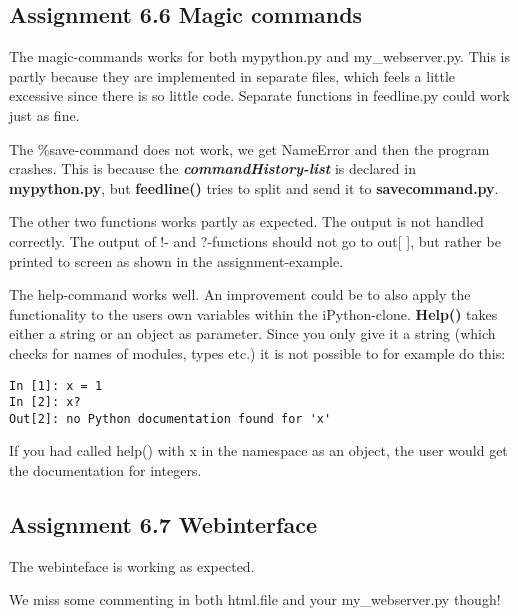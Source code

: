 \documentclass[a4paper]{article}
\begin{document}
\subsection*{Assignment 6.6 Magic commands}

\begin{flushleft}
The magic-commands works for both mypython.py and my\_webserver.py. This is partly because they are implemented in separate files, which feels a little excessive since there is so little code. Separate functions in feedline.py could work just as fine. \newline

The \%save-command does not work, we get NameError and then the program crashes. This is because the \textbf{\textit{commandHistory-list}} is declared in \textbf{mypython.py}, but \textbf{feedline()} tries to split and send it to \textbf{savecommand.py}. \newline

The other two functions works partly as expected. The output is not handled correctly. The output of !- and ?-functions should not go to out[ ], but rather be printed to screen as shown in the assignment-example. \newline

The help-command works well. An improvement could be to also apply the functionality to the users own variables within the iPython-clone. \textbf{Help()} takes either a string or an object as parameter. Since you only give it a string (which checks for names of modules, types etc.) it is not possible to for example do this: \newline

\begin{verbatim}
In [1]: x = 1
In [2]: x?
Out[2]: no Python documentation found for 'x'
\end{verbatim}

If you had called help() with x in the namespace as an object, the user would get the documentation for integers.
\end{flushleft}

\subsection*{Assignment 6.7 Webinterface}
\begin{flushleft}
The webinteface is working as expected.\newline

We miss some commenting in both html.file and your my\_webserver.py though!

\end{flushleft}



\end{document}
